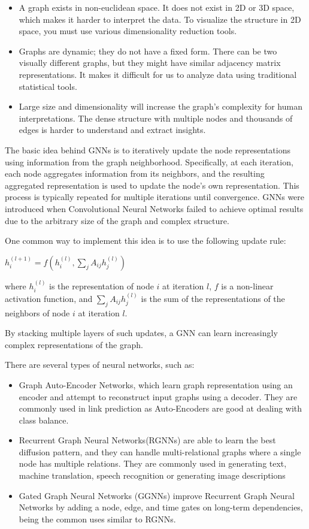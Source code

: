 \begin{itemize}
	\item A graph exists in non-euclidean space. It does not exist in 2D or 3D space, which makes it harder to interpret the data. To visualize the structure in 2D space, you must use various dimensionality reduction tools.
	\item Graphs are dynamic; they do not have a fixed form. There can be two visually different graphs, but they might have similar adjacency matrix representations. It makes it difficult for us to analyze data using traditional statistical tools.
	\item Large size and dimensionality will increase the graph's complexity for human interpretations. The dense structure with multiple nodes and thousands of edges is harder to understand and extract insights. 
\end{itemize}

The basic idea behind GNNs is to iteratively update the node representations using information from the graph neighborhood. Specifically, at each iteration, each node aggregates information from its neighbors, and the resulting aggregated representation is used to update the node's own representation. This process is typically repeated for multiple iterations until convergence. GNNs were introduced when Convolutional Neural Networks failed to achieve optimal results due to the arbitrary size of the graph and complex structure. 

One common way to implement this idea is to use the following update rule:

$h_i^{(l+1)} = f(h_i^{(l)}, \sum_{j} A_{ij} h_j^{(l)})$

where $h_i^{(l)}$ is the representation of node $i$ at iteration $l$, $f$ is a non-linear activation function, and $\sum_{j} A_{ij} h_j^{(l)}$ is the sum of the representations of the neighbors of node $i$ at iteration $l$.

By stacking multiple layers of such updates, a GNN can learn increasingly complex representations of the graph.

There are several types of neural networks, such as:

\begin{itemize}
	\item Graph Auto-Encoder Networks, which learn graph representation using an encoder and attempt to reconstruct input graphs using a decoder. They are commonly used in link prediction as Auto-Encoders are good at dealing with class balance. 
	\item Recurrent Graph Neural Networks(RGNNs) are able to learn the best diffusion pattern, and they can handle multi-relational graphs where a single node has multiple relations. They are commonly used in generating text, machine translation, speech recognition or generating image descriptions
	\item Gated Graph Neural Networks (GGNNs) improve Recurrent Graph Neural Networks by adding a node, edge, and time gates on long-term dependencies, being the common uses similar to RGNNs.
\end{itemize}

